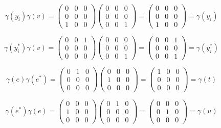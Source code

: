\begin{solution}
    $$\gamma(y_i)\gamma(v)=
    \left(\begin{array}{ccc} 0 & 0 & 0 \\ 0 & 0 & 0 \\ 1 & 0 & 0 \end{array}\right)
    \left(\begin{array}{ccc} 0 & 0 & 0 \\ 0 & 0 & 0 \\ 0 & 0 & 1 \end{array}\right)
    =\left(\begin{array}{ccc} 0 & 0 & 0 \\ 0 & 0 & 0 \\ 1 & 0 & 0 \end{array}\right)=\gamma(y_i)$$

    $$\gamma(y_i^*)\gamma(v)=
    \left(\begin{array}{ccc} 0 & 0 & 1 \\ 0 & 0 & 0 \\ 0 & 0 & 0 \end{array}\right)
    \left(\begin{array}{ccc} 0 & 0 & 0 \\ 0 & 0 & 0 \\ 0 & 0 & 1 \end{array}\right)
    =\left(\begin{array}{ccc} 0 & 0 & 1 \\ 0 & 0 & 0 \\ 0 & 0 & 1 \end{array}\right)=\gamma(y_i^*)$$

    $$\gamma(e)\gamma(e^*)=
    \left(\begin{array}{ccc} 0 & 1 & 0 \\ 0 & 0 & 0 \\ 0 & 0 & 0 \end{array}\right)
    \left(\begin{array}{ccc} 0 & 0 & 0 \\ 1 & 0 & 0 \\ 0 & 0 & 0 \end{array}\right)
    =\left(\begin{array}{ccc} 1 & 0 & 0 \\ 0 & 0 & 0 \\ 0 & 0 & 0 \end{array}\right)=\gamma(t)$$

    $$\gamma(e^*)\gamma(e)=
    \left(\begin{array}{ccc} 0 & 0 & 0 \\ 1 & 0 & 0 \\ 0 & 0 & 0 \end{array}\right)
    \left(\begin{array}{ccc} 0 & 1 & 0 \\ 0 & 0 & 0 \\ 0 & 0 & 0 \end{array}\right)
    =\left(\begin{array}{ccc} 0 & 0 & 0 \\ 0 & 1 & 0 \\ 0 & 0 & 0 \end{array}\right)=\gamma(u)$$


\end{solution}
